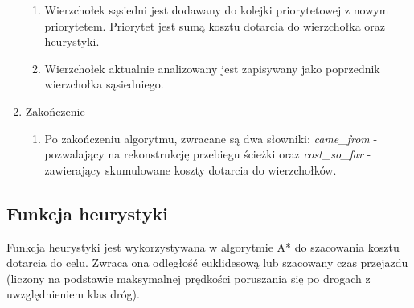 \documentclass{article}
\begin{document}
\begin{enumerate}
\begin{enumerate}
        \item Wierzchołek sąsiedni jest dodawany do kolejki priorytetowej z nowym priorytetem. Priorytet jest sumą kosztu dotarcia do wierzchołka oraz heurystyki.
        \item Wierzchołek aktualnie analizowany jest zapisywany jako poprzednik wierzchołka sąsiedniego.
    \end{enumerate}
    \item Zakończenie 
    \begin{enumerate}
        \item Po zakończeniu algorytmu, zwracane są dwa słowniki: \textit{came\_from} - pozwalający na rekonstrukcję przebiegu ścieżki oraz \textit{cost\_so\_far} - zawierający skumulowane koszty dotarcia do wierzchołków.
    \end{enumerate}
\end{enumerate}

\subsection{Funkcja heurystyki}
Funkcja heurystyki jest wykorzystywana w algorytmie A* do szacowania kosztu dotarcia do celu. 
Zwraca ona odległość euklidesową lub szacowany czas przejazdu (liczony na podstawie maksymalnej prędkości poruszania się po drogach z uwzględnieniem klas dróg).
\end{document}

